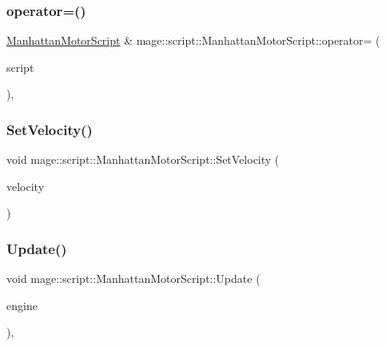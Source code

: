 \subsubsection{\texorpdfstring{operator=()}{operator=()}\hspace{0.1cm}{\footnotesize\ttfamily [2/2]}}
{\footnotesize\ttfamily \mbox{\hyperlink{classmage_1_1script_1_1_manhattan_motor_script}{Manhattan\+Motor\+Script}} \& mage\+::script\+::\+Manhattan\+Motor\+Script\+::operator= (\begin{DoxyParamCaption}\item[{\mbox{\hyperlink{classmage_1_1script_1_1_manhattan_motor_script}{Manhattan\+Motor\+Script}} \&\&}]{script }\end{DoxyParamCaption})\hspace{0.3cm}{\ttfamily [default]}, {\ttfamily [noexcept]}}

\mbox{\label{classmage_1_1script_1_1_manhattan_motor_script_acf4db52ae6b0c9f97c0b7e719acea6bc}} 
\subsubsection{\texorpdfstring{Set\+Velocity()}{SetVelocity()}}
{\footnotesize\ttfamily void mage\+::script\+::\+Manhattan\+Motor\+Script\+::\+Set\+Velocity (\begin{DoxyParamCaption}\item[{\mbox{\hyperlink{namespacemage_aa97e833b45f06d60a0a9c4fc22ae02c0}{F32}}}]{velocity }\end{DoxyParamCaption})\hspace{0.3cm}{\ttfamily [noexcept]}}

\mbox{\label{classmage_1_1script_1_1_manhattan_motor_script_af1ee420e1378bf930cce1ce92a37d640}} 
\subsubsection{\texorpdfstring{Update()}{Update()}}
{\footnotesize\ttfamily void mage\+::script\+::\+Manhattan\+Motor\+Script\+::\+Update (\begin{DoxyParamCaption}\item[{\mbox{[}\mbox{[}maybe\+\_\+unused\mbox{]} \mbox{]} \mbox{\hyperlink{classmage_1_1_engine}{Engine}} \&}]{engine }\end{DoxyParamCaption})\hspace{0.3cm}{\ttfamily [override]}, {\ttfamily [virtual]}}

